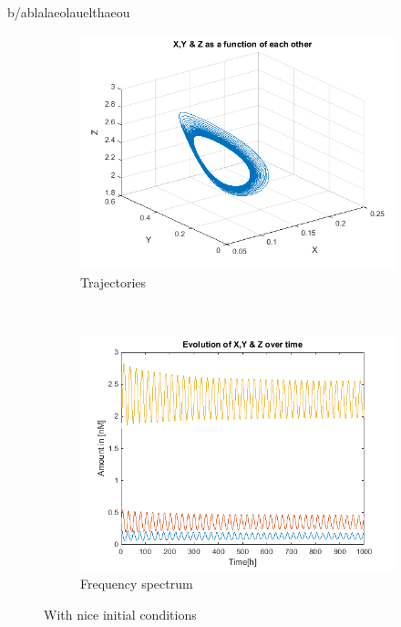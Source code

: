 \documentclass[10pt,a4paper,oneside,twocolumn]{article}
\numberwithin{equation}{section} %
\begin{document}
    b/ablalaeolauelthaeou

    \begin{figure}[!h]
	\begin{subfigure}[b]{0.5\textwidth}
	    \includegraphics[width=\textwidth]{A11.png}
	    \caption{Trajectories}
	\end{subfigure}
	~
	\begin{subfigure}[b]{0.5\textwidth}
	    \includegraphics[width=\textwidth]{A12.png}
	    \caption{Frequency spectrum}
	\end{subfigure}
	\caption{With nice initial conditions}
    \end{figure}
\end{document}
